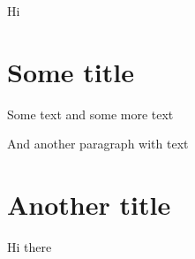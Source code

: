 Hi

\section{Some title}
Some text
and some more text

And another paragraph
with text

\section{Another title}
Hi there

